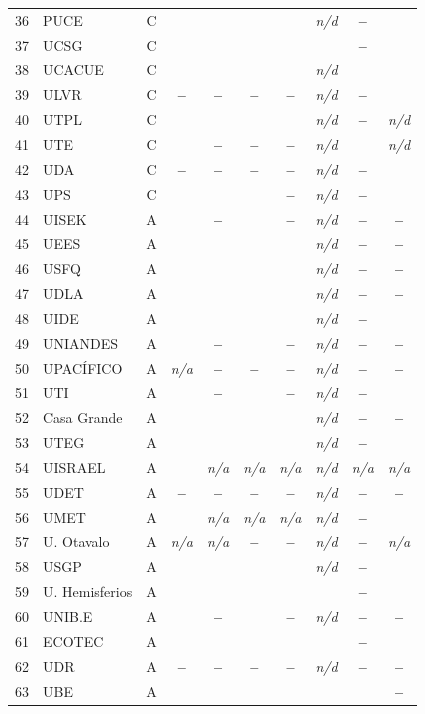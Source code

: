 \documentclass[pdflatex,sn-basic,Numbered]{sn-jnl}
\newcommand{\si}{\ding{51}}
\newcommand{\no}{\textcolor{gris}{\textbf{--}}}
\newcommand{\nv}{\textsl{\footnotesize n/a}}
\newcommand{\nd}{\textsl{\footnotesize n/d}}
\theoremstyle{thmstyleone}
\theoremstyle{thmstyletwo}
\theoremstyle{thmstylethree}
\begin{document}
\begin{appendices}
\begin{longtable}{@{}r l c c c c c c c c@{}}
	36 & PUCE & C & \si & \si & \si & \si & \nd & \no & \si \\
	37 & UCSG & C & \si & \si & \si & \si & \si & \no & \si \\
	38 & UCACUE & C & \si & \si & \si & \si & \nd & \si & \si \\
	39 & ULVR & C & \no & \no & \no & \no & \nd & \no & \si \\
	40 & UTPL & C & \si & \si & \si & \si & \nd & \no & \nd \\
	41 & UTE & C & \si & \no & \no & \no & \nd & \si & \nd \\
	42 & UDA & C & \no & \no & \no & \no & \nd & \no & \si \\
	43 & UPS & C & \si & \si & \si & \no & \nd & \no & \si \\
	44 & UISEK & A & \si & \no & \si & \no & \nd & \no & \no \\
	45 & UEES & A & \si & \si & \si & \si & \nd & \no & \no \\
	46 & USFQ & A & \si & \si & \si & \si & \nd & \no & \no \\
	47 & UDLA & A & \si & \si & \si & \si & \nd & \no & \no \\
	48 & UIDE & A & \si & \si & \si & \si & \nd & \no & \si \\
	49 & UNIANDES & A & \si & \no & \si & \no & \nd & \no & \no \\
	50 & UPACÍFICO & A & \nv & \no & \no & \no & \nd & \no & \no \\
	51 & UTI & A & \si & \no & \si & \no & \nd & \no & \si \\
	52 & Casa Grande & A & \si & \si & \si & \si & \nd & \no & \no \\
	53 & UTEG & A & \si & \si & \si & \si & \nd & \no & \si \\
	54 & UISRAEL & A & \si & \nv & \nv & \nv & \nd & \nv & \nv \\
	55 & UDET & A & \no & \no & \no & \no & \nd & \no & \no \\
	56 & UMET & A & \si & \nv & \nv & \nv & \nd & \no & \si \\
	57 & U. Otavalo & A & \nv & \nv & \no & \no & \nd & \no & \nv \\
	58 & USGP & A & \si & \si & \si & \si & \nd & \no & \si \\
	59 & U. Hemisferios & A & \si & \si & \si & \si & \si & \no & \si \\
	60 & UNIB.E & A & \si & \no & \si & \no & \nd & \no & \no \\
	61 & ECOTEC & A & \si & \si & \si & \si & \si & \no & \si \\
	62 & UDR & A & \no & \no & \no & \no & \nd & \no & \no \\
	63 & UBE & A & \si & \si & \si & \si & \si & \si & \no \\
\end{longtable}
\normalsize
\end{appendices}


\end{document}

